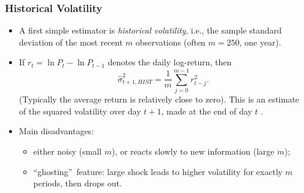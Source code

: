 \begin{frame}%

\frametitle{Historical Volatility}

\begin{itemize}
\item A first simple estimator is \emph{\color{red}historical volatility},
i.e., the sample standard deviation of the most recent $m$ observations
(often $m=250$, one year).

\item If $r_{t}=\ln P_t-\ln P_{t-1}$ denotes the daily log-return, then
\begin{equation*}
\widehat{\sigma}_{t+1,HIST}^{2}=\frac{1}{m}\sum_{j=0}^{m-1}r_{t-j}^{2}.
\end{equation*}
(Typically the average return is relatively close to zero). This is an
estimate of the squared volatility over day $t+1$, made at the end of day $t$%
.

\item Main disadvantages:

\begin{itemize}
\item either noisy (small $m$), or reacts slowly to new information (large $%
m $);

\item \textquotedblleft ghosting\textquotedblright\ feature: large shock
leads to higher volatility for exactly $m$ periods, then drops out.
\end{itemize}
\end{itemize}

\end{frame}%

